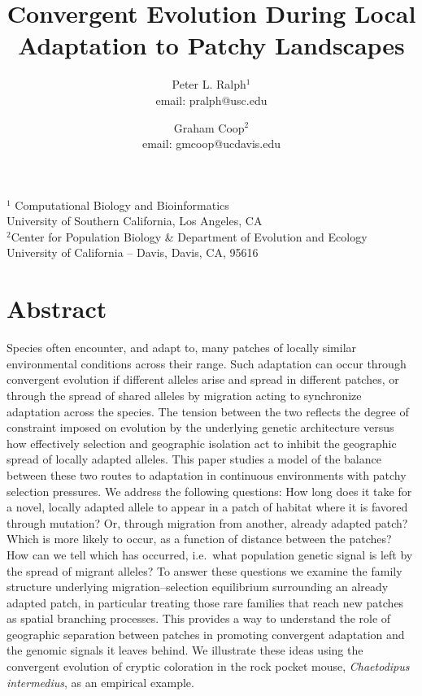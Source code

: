 \documentclass{article}
\date{}
\title 
{
Convergent Evolution During Local Adaptation to Patchy Landscapes
}
\author{Peter L. Ralph$^1$ \\ email: pralph@usc.edu  \and Graham Coop$^2$ \\ email: gmcoop@ucdavis.edu }
\begin{document}
\maketitle
\begin{center}

$^1$ Computational Biology and Bioinformatics \\ 
University of Southern California, Los Angeles, CA \\
$^2$Center for Population Biology \& Department of Evolution and Ecology \\ 
University of California -- Davis, Davis, CA, 95616
\end{center}


\section*{Abstract}
Species often encounter, and adapt to, many patches of locally similar environmental conditions across their range. 
Such adaptation can occur through convergent evolution if different alleles arise and spread in different patches, 
or through the spread of shared alleles by migration
acting to synchronize adaptation across the species.
The tension between the two reflects 
the degree of constraint imposed on evolution by the underlying genetic architecture 
versus how effectively selection and geographic isolation act to inhibit the geographic spread of locally adapted alleles.
This paper studies a model of the balance between these two routes to adaptation in continuous environments with patchy selection pressures.
We address the following questions: 
How long does it take for a novel, locally adapted allele to appear in a
patch of habitat where it is favored through mutation?
Or, through migration from another, already adapted patch?
Which is more likely to occur, as a function of distance between the patches?
How can we tell which has occurred, i.e.\ what population genetic
signal is left by the spread of migrant alleles?
To answer these questions we examine the family structure underlying migration--selection equilibrium
surrounding an already adapted patch,
in particular treating those rare families that reach new patches
as spatial branching processes.
This provides a way to understand the role of geographic separation between patches 
in promoting convergent adaptation and the genomic signals it leaves behind.
We illustrate these ideas using the convergent evolution of cryptic coloration in the rock pocket mouse, \textit{Chaetodipus intermedius}, as an empirical example.
\end{document}
